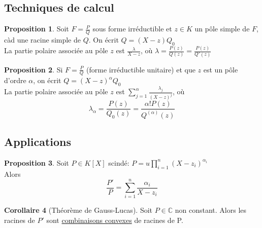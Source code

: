 \documentclass[10pt,a4paper]{article}
\theoremstyle{definition}
\newtheorem{proposition}{Proposition}[section]
\newtheorem{corollaire}[proposition]{Corollaire}
\begin{document}
\subsection{Techniques de calcul}
\begin{proposition}
Soit $F = \frac{P}{Q}$ sous forme irréductible et $z \in K$ un pôle simple de $F$, càd une racine simple de $Q$. On écrit $Q = (X - z) Q_0$ \\
La partie polaire associée au pôle $z$ est $\frac{\lambda}{X - z}$, où $\lambda = \frac{P(z)}{Q(z)} = \frac{P(z)}{Q'(z)}$
\end{proposition}
\begin{proposition}
Si $F = \frac{P}{Q}$ (forme irréductible unitaire) et que $z$ est un pôle d'ordre $\alpha$, on écrit $Q = (X - z)^\alpha Q_0$ \\
La partie polaire associée au pôle $z$ est $\sum\limits_{j = 1}^\alpha \frac{\lambda_j}{(X - z)^j}$, où
\[\lambda_\alpha = \frac{P(z)}{Q_0(z)} = \frac{\alpha! P(z)}{Q^{(\alpha)}(z)}\]
\end{proposition}

\subsection{Applications}
\begin{proposition}
Soit $P \in K[X]$ scindé: $P = u \prod\limits_{i = 1}^n (X - z_i)^{\alpha_i}$ \\
Alors
\[\frac{P'}{P} = \sum\limits_{i = 1}^n \frac{\alpha_i}{X - z_i}\]
\end{proposition}
\begin{corollaire}[Théorème de Gauss-Lucas]
Soit $P \in \mathbb{C}$ non constant. Alors les racines de $P'$ sont \uline{combinaisons convexes} de racines de P.
\end{corollaire}
\end{document}
